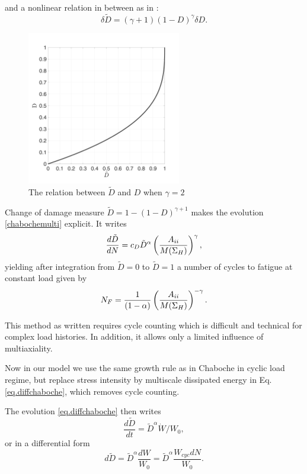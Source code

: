 and a nonlinear relation in between as in :
$$\delta\tilde{D}=\left(\gamma+1 \right)\left( 1-D\right)^\gamma \delta D.$$	
\begin{figure}
\centering
\includegraphics[width=0.6\textwidth]{figures//Dhat.png} 
\caption{The relation between $\tilde{D}$ and $D$ when $\gamma=2$}
\label{fig.Dhat}
\end{figure}

Change of damage measure $\tilde{D} = 1 - (1-D)^{\gamma+1}$ makes the evolution \eqref{chabochemulti} explicit. It writes
\begin{equation}
\dfrac{d\tilde{D}}{dN} = c_D {\tilde{D}}^\alpha \left(\dfrac{{A}_{\uppercase\expandafter{\romannumeral2}}}{M(\Sigma_{H})} \right) ^\gamma,
\label{eq.diffchaboche}
\end{equation}
yielding after integration from $\tilde{D}=0$ to $\tilde{D}=1$  a number of cycles to fatigue at constant load given by
$$
N_F =\dfrac{1}{(1-\alpha)}\left(\dfrac{{A}_{\uppercase\expandafter{\romannumeral2}}}{M(\Sigma_{H})} \right) ^{-\gamma}.
$$

This method as written requires cycle counting which is difficult and technical for complex load histories. In addition, it allows only a limited influence of multiaxiality.


Now in our model we use the same growth rule as in Chaboche in cyclic load regime, but replace stress intensity by multiscale dissipated energy  in Eq.\eqref{eq.diffchaboche}, which removes cycle counting.

The evolution \eqref{eq.diffchaboche} then writes
$$
\dfrac{d\tilde{D}}{dt} ={\tilde{D}}^\alpha \dot{W}/W_0,
$$
or in a differential form
\begin{equation}
d \tilde{D}=\tilde{D}^\alpha\dfrac{d W}{W_0}=\tilde{D}^\alpha\dfrac{W_{cyc}d N}{W_0}.
\label{eq.DWcyc}
\end{equation}

